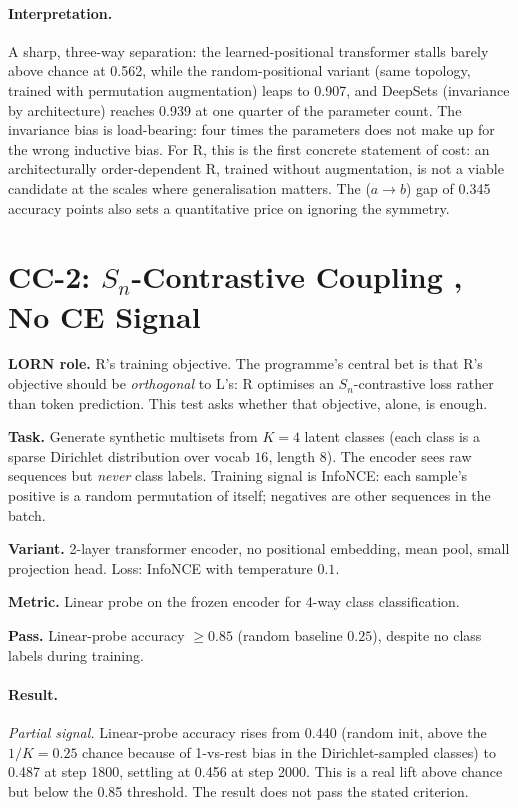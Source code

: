 \documentclass[10pt, twocolumn, a4paper]{article}
\newcommand{\Sn}{S_n}
\begin{document}
\paragraph{Interpretation.} A sharp, three-way separation: the learned-positional transformer stalls barely above chance at 0.562, while the random-positional variant (same topology, trained with permutation augmentation) leaps to 0.907, and DeepSets (invariance by architecture) reaches 0.939 at one quarter of the parameter count. The invariance bias is load-bearing: four times the parameters does not make up for the wrong inductive bias. For R, this is the first concrete statement of cost: an architecturally order-dependent R, trained without augmentation, is not a viable candidate at the scales where generalisation matters. The ($a \to b$) gap of 0.345 accuracy points also sets a quantitative price on ignoring the symmetry.

\section{CC-2: $\Sn$-Contrastive Coupling ,  No CE Signal}

\textbf{LORN role.} R's training objective. The programme's central bet is that R's objective should be \emph{orthogonal} to L's: R optimises an $\Sn$-contrastive loss rather than token prediction. This test asks whether that objective, alone, is enough.

\textbf{Task.} Generate synthetic multisets from $K=4$ latent classes (each class is a sparse Dirichlet distribution over vocab $16$, length $8$). The encoder sees raw sequences but \emph{never} class labels. Training signal is InfoNCE: each sample's positive is a random permutation of itself; negatives are other sequences in the batch.

\textbf{Variant.} 2-layer transformer encoder, no positional embedding, mean pool, small projection head. Loss: InfoNCE with temperature $0.1$.

\textbf{Metric.} Linear probe on the frozen encoder for 4-way class classification.

\textbf{Pass.} Linear-probe accuracy $\ge 0.85$ (random baseline $0.25$), despite no class labels during training.

\paragraph{Result.} \emph{Partial signal.} Linear-probe accuracy rises from 0.440 (random init, above the $1/K = 0.25$ chance because of 1-vs-rest bias in the Dirichlet-sampled classes) to 0.487 at step 1800, settling at 0.456 at step 2000. This is a real lift above chance but below the 0.85 threshold. The result does not pass the stated criterion.
\end{document}
